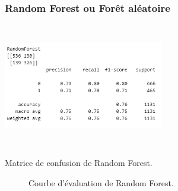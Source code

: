 \subsubsection*{Random Forest ou Forêt aléatoire}
\begin{minipage}[t]{0.5\textwidth}
    \begin{table}[H]
        \centering
        \setlength{\fboxsep}{5pt}
        \setlength{\fboxrule}{0.5pt}
        \includegraphics[width=7cm,height=5.4cm]{images/RandomForest.png}
        \caption{Matrice de confusion de Random Forest.}
    \end{table}
\end{minipage}
\begin{minipage}[t]{0.5\textwidth}
    \begin{figure}[H]
        \centering
        \setlength{\fboxsep}{5pt}
        \setlength{\fboxrule}{0.5pt}
        \caption{Courbe d'évaluation de Random Forest.}
    \end{figure}
\end{minipage}

